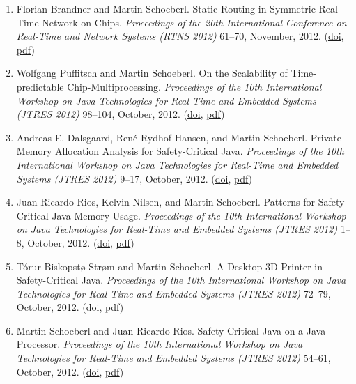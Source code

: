 \begin{enumerate}
\item Florian Brandner and Martin Schoeberl.
 Static Routing in Symmetric Real-Time Network-on-Chips.
 \emph{Proceedings of the 20th International Conference on Real-Time and Network Systems (RTNS 2012)} 61--70, November, 2012.
(\href{http://dx.doi.org/10.1145/2392987.2392995}{doi}, \href{http://www.jopdesign.com/doc/nocshd.pdf}{pdf})

\item Wolfgang Puffitsch and Martin Schoeberl.
 On the Scalability of Time-predictable Chip-Multiprocessing.
 \emph{Proceedings of the 10th International Workshop on Java Technologies for Real-Time and Embedded Systems (JTRES 2012)} 98--104, October, 2012.
(\href{http://dx.doi.org/10.1145/2388936.2388953}{doi}, \href{http://www.jopdesign.com/doc/jopscale.pdf}{pdf})

\item Andreas E. Dalsgaard, Ren\'{e} Rydhof Hansen, and Martin Schoeberl.
 Private Memory Allocation Analysis for Safety-Critical Java.
 \emph{Proceedings of the 10th International Workshop on Java Technologies for Real-Time and Embedded Systems (JTRES 2012)} 9--17, October, 2012.
(\href{http://dx.doi.org/10.1145/2388936.2388939}{doi}, \href{http://www.jopdesign.com/doc/privmem.pdf}{pdf})

\item Juan Ricardo Rios, Kelvin Nilsen, and Martin Schoeberl.
 Patterns for Safety-Critical Java Memory Usage.
 \emph{Proceedings of the 10th International Workshop on Java Technologies for Real-Time and Embedded Systems (JTRES 2012)} 1--8, October, 2012.
(\href{http://dx.doi.org/10.1145/2388936.2388938}{doi}, \href{http://www.jopdesign.com/doc/scopeuse.pdf}{pdf})

\item T{\'o}rur Biskopst{\o} Str{\o}m and Martin Schoeberl.
 A Desktop 3D Printer in Safety-Critical Java.
 \emph{Proceedings of the 10th International Workshop on Java Technologies for Real-Time and Embedded Systems (JTRES 2012)} 72--79, October, 2012.
(\href{http://dx.doi.org/10.1145/2388936.2388949}{doi}, \href{http://www.jopdesign.com/doc/scjreprap.pdf}{pdf})

\item Martin Schoeberl and Juan Ricardo Rios.
 Safety-Critical Java on a Java Processor.
 \emph{Proceedings of the 10th International Workshop on Java Technologies for Real-Time and Embedded Systems (JTRES 2012)} 54--61, October, 2012.
(\href{http://dx.doi.org/10.1145/2388936.2388946}{doi}, \href{http://www.jopdesign.com/doc/jopscj.pdf}{pdf})


\end{enumerate}
